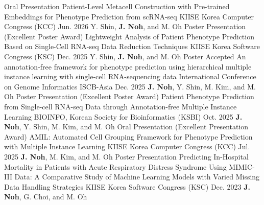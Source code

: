 \documentclass[11pt, a4paper]{awesome-cv}
\let\origcvsection\cvsection
\renewcommand{\cvsection}[1]{\needspace{7\baselineskip}\origcvsection{#1}}
\begin{document}
\begin{cventries}
\cventry
    {Oral Presentation}
    {Patient-Level Metacell Construction with Pre-trained Embeddings for Phenotype Prediction from scRNA-seq}
    {KIISE Korea Computer \newline Congress (KCC)}
    {Jun. 2026}
    {
      Y. Shin, \textbf{J. Noh}, and M. Oh
    }
\vspace{3.5mm}
\cventry
    {Poster Presentation (Excellent Poster Award)}
    {Lightweight Analysis of Patient Phenotype Prediction Based on Single-Cell RNA-seq \newline Data Reduction Techniques}
    {KIISE Korea Software \newline Congress (KSC)}
    {Dec. 2025}
    {
      Y. Shin, \textbf{J. Noh}, and M. Oh
    }
\vspace{3.5mm}
\cventry
    {Poster Accepted}
    {An annotation-free framework for phenotype prediction using hierarchical multiple instance learning with single-cell RNA-sequencing data}
    {International Conference on Genome Informatics ISCB-Asia}
    {Dec. 2025}
    {
      \textbf{J. Noh}, Y. Shin, M. Kim, and M. Oh
    }
\vspace{3.5mm}
\cventry
    {Poster Presentation (Excellent Poster Award)}
    {Patient Phenotype Prediction from Single-cell RNA-seq Data through Annotation-free Multiple Instance Learning}
    {BIOINFO, Korean Society \newline for Bioinformatics (KSBI)}
    {Oct. 2025}
    {
      \textbf{J. Noh}, Y. Shin, M. Kim, and M. Oh
    }
\vspace{3.5mm}
\cventry
    {Oral Presentation (Excellent Presentation Award)}
    {AMIL: Automated Cell Grouping Framework for Phenotype Prediction with Multiple Instance Learning}
    {KIISE Korea Computer \newline Congress (KCC)}
    {Jul. 2025}
    {
      \textbf{J. Noh}, M. Kim, and M. Oh
    }
\vspace{3.5mm}
\cventry
    {Poster Presentation}
    {Predicting In-Hospital Mortality in Patients with Acute Respiratory Distress Syndrome Using MIMIC-III Data: A Comparative Study of Machine Learning Models with Varied Missing Data Handling Strategies}
    {KIISE Korea Software \newline Congress (KSC)}
    {Dec. 2023}
    {
      \textbf{J. Noh}, G. Choi, and M. Oh
    }
\end{cventries}


\vspace{1mm}
\end{document}
